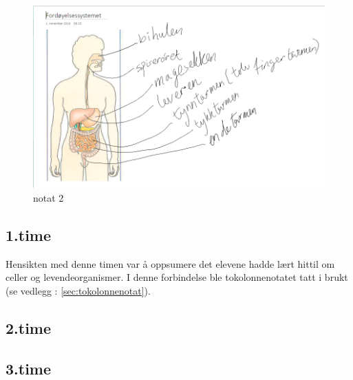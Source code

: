 \documentclass[main.tex]{subfiles}
\begin{document}
\begin{figure}[h!]
\includegraphics[scale = 0.6]{../figures/onenote_fordoyelse.png}
\caption{notat 2}
\label{fig:notat2}
\end{figure}

\subsection*{1.time}

Hensikten med denne timen var å oppsumere det elevene hadde lært hittil om celler og levendeorganismer. 
I denne forbindelse ble tokolonnenotatet tatt i brukt (se vedlegg : \ref{sec:tokolonnenotat}).

\subsection*{2.time}


\subsection*{3.time}
\end{document}
